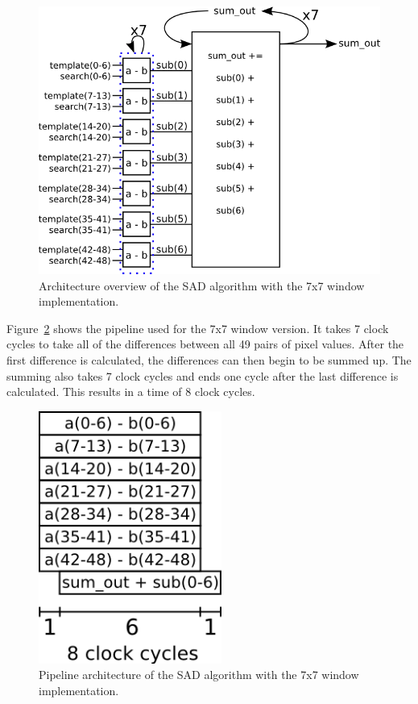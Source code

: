 \begin{figure}[h]
	\begin{center}
		\includegraphics[width=120mm]{figures/sadAlgorithm7x7.png}
		\captionfonts
		\caption{Architecture overview of the SAD algorithm with the 7x7 window implementation.}
		\label{fig:sadAlg7x7}
	\end{center}
\end{figure}

Figure~\ref{fig:sadPipe7x7} shows the pipeline used for the 7x7 window version. It takes 7 clock cycles to take all of the differences between all 49 pairs of pixel values. After the first difference is calculated, the differences can then begin to be summed up. The summing also takes 7 clock cycles and ends one cycle after the last difference is calculated. This results in a time of 8 clock cycles.

\begin{figure}[h]
	\begin{center}
		\includegraphics[width=60mm]{figures/sadPipeline7x7.png}
		\captionfonts
		\caption{Pipeline architecture of the SAD algorithm with the 7x7 window implementation.}
		\label{fig:sadPipe7x7}
	\end{center}
\end{figure}

